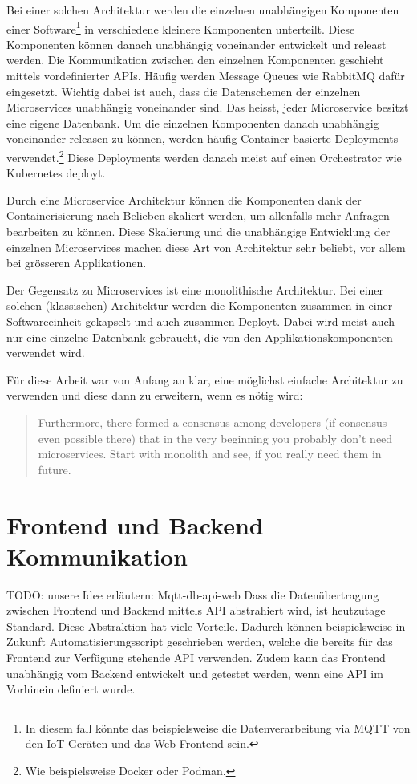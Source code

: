 Bei einer solchen Architektur werden die einzelnen unabhängigen Komponenten
einer Software\footnote{
    In diesem fall könnte das beispielsweise die Datenverarbeitung via MQTT
    von den \ac{IoT} Geräten und das Web Frontend sein.
} in verschiedene kleinere Komponenten unterteilt.
Diese Komponenten können danach unabhängig voneinander entwickelt und
releast werden.
Die Kommunikation zwischen den einzelnen Komponenten geschieht mittels
vordefinierter \ac{API}s. Häufig werden Message Queues wie RabbitMQ dafür
eingesetzt. Wichtig dabei ist auch, dass die Datenschemen der einzelnen
Microservices unabhängig voneinander sind. Das heisst, jeder Microservice
besitzt eine eigene Datenbank. \parencite{microservices}
Um die einzelnen Komponenten danach unabhängig voneinander releasen zu
können, werden häufig Container basierte Deployments verwendet.\footnote{
    Wie beispielsweise Docker oder Podman.
}
Diese Deployments werden danach meist auf einen Orchestrator wie Kubernetes
deployt.

Durch eine Microservice Architektur können die Komponenten dank der Containerisierung
nach Belieben skaliert werden, um allenfalls mehr Anfragen bearbeiten zu können.
Diese Skalierung und die unabhängige Entwicklung der einzelnen Microservices
machen diese Art von Architektur sehr beliebt, vor allem bei grösseren Applikationen.

Der Gegensatz zu Microservices ist eine monolithische Architektur. Bei einer
solchen (klassischen) Architektur werden die Komponenten zusammen in einer
Softwareeinheit gekapselt und auch zusammen Deployt.
Dabei wird meist auch nur eine einzelne Datenbank gebraucht, die von den
Applikationskomponenten verwendet wird.

Für diese Arbeit war von Anfang an klar, eine möglichst einfache
Architektur zu verwenden und diese dann zu erweitern, wenn es nötig wird:

\blockquote{
    Furthermore, there formed a consensus among developers (if consensus even possible there) that in
    the very beginning you probably don’t need microservices. Start with monolith and see,
    if you really need them in future. \cite{microservice-shared-db}
}

\section{Frontend und Backend Kommunikation}
\label{konzepte:api-kommunikation}

TODO: unsere Idee erläutern: Mqtt-db-api-web
Dass die Datenübertragung zwischen Frontend und Backend mittels \ac{API} abstrahiert
wird, ist heutzutage Standard. Diese Abstraktion hat viele Vorteile.
Dadurch können beispielsweise in Zukunft Automatisierungsscript geschrieben werden,
welche die bereits für das Frontend zur Verfügung stehende \ac{API} verwenden.
Zudem kann das Frontend unabhängig vom Backend entwickelt und getestet werden,
wenn eine \ac{API} im Vorhinein definiert wurde.

